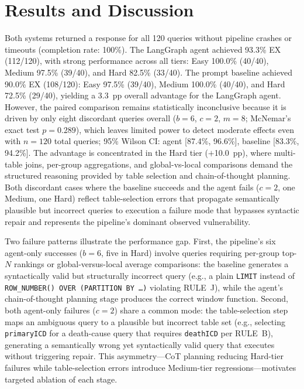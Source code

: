 \documentclass[conference]{IEEEtran}
\begin{document}
\section{Results and Discussion}
\label{sec:results}


Both systems returned a response for all 120 queries without pipeline crashes or timeouts (completion rate: 100\%). The LangGraph agent achieved 93.3\% EX (112/120), with strong performance across all tiers: Easy 100.0\% (40/40), Medium 97.5\% (39/40), and Hard 82.5\% (33/40). The prompt baseline achieved 90.0\% EX (108/120): Easy 97.5\% (39/40), Medium 100.0\% (40/40), and Hard 72.5\% (29/40), yielding a 3.3~pp overall advantage for the LangGraph agent. However, the paired comparison remains statistically inconclusive because it is driven by only eight discordant queries overall ($b{=}6$, $c{=}2$, $m{=}8$; McNemar's exact test $p{=}0.289$), which leaves limited power to detect moderate effects even with $n{=}120$ total queries; 95\% Wilson CI: agent [87.4\%, 96.6\%], baseline [83.3\%, 94.2\%]. The advantage is concentrated in the Hard tier ($+$10.0~pp), where multi-table joins, per-group aggregations, and global-vs-local comparisons demand the structured reasoning provided by table selection and chain-of-thought planning. Both discordant cases where the baseline succeeds and the agent fails ($c{=}2$, one Medium, one Hard) reflect table-selection errors that propagate semantically plausible but incorrect queries to execution a failure mode that bypasses syntactic repair and represents the pipeline's dominant observed vulnerability.

Two failure patterns illustrate the performance gap. First, the pipeline's six agent-only successes ($b{=}6$, five in Hard) involve queries requiring per-group top-$N$ rankings or global-versus-local average comparisons: the baseline generates a syntactically valid but structurally incorrect query (e.g., a plain \texttt{LIMIT} instead of \texttt{ROW\_NUMBER() OVER (PARTITION BY \ldots)} violating RULE~J), while the agent's chain-of-thought planning stage produces the correct window function. Second, both agent-only failures ($c{=}2$) share a common mode: the table-selection step maps an ambiguous query to a plausible but incorrect table set (e.g., selecting \texttt{primaryICD} for a death-cause query that requires \texttt{deathICD} per RULE~B), generating a semantically wrong yet syntactically valid query that executes without triggering repair. This asymmetry---CoT planning reducing Hard-tier failures while table-selection errors introduce Medium-tier regressions---motivates targeted ablation of each stage.
\end{document}
